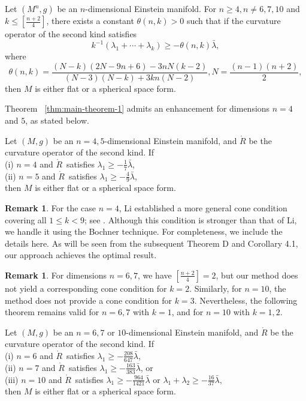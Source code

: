 \documentclass[11pt, reqno]{amsart}
\numberwithin{equation}{section}
\theoremstyle{definition}
\newtheorem{remark}[thm]{Remark}
\begin{document}
	\begin{maintheorem}\label{thm:main-theorem-1}
		Let $(M^n, g)$ be an $n$-dimensional  Einstein manifold. For $n \ge 4,n\ne 6, 7, 10$ and $k\le[\frac{n+2}{4}]$, there exists a constant $\theta(n,k) >0$ such that if the curvature operator of the second kind satisfies 
		\[k^{-1}({\lambda }_1+\cdots +{\lambda }_k)\ge -\theta(n,k) \bar{\lambda },\]
		where $$\theta(n,k) =\frac{(N-k)(2N-9n+6)-3nN(k-2)}{(N-3)(N-k)+3kn(N-2)},N=\frac{(n-1)(n+2)}{2},$$
		then $M$ is either flat or a spherical space form.
	\end{maintheorem}
	Theorem ~\ref{thm:main-theorem-1}  admits an enhancement for dimensions $n = 4$ and $5$, as stated below.
		\begin{maintheorem}\label{thm:main-theorem-2} 
		Let $(M, g)$ be an $n = 4, 5$-dimensional  Einstein manifold, and $\mathring{R}$ be the curvature operator of the second kind. If\\
		(i) $n=4$ and $\mathring{R}\,$ satisfies ${\lambda }_1\ge -\frac{1}{7}\bar{\lambda }$,\\
		(ii) $n=5$ and $\mathring{R}\,$ satisfies ${\lambda }_1\ge -\frac{4}{9}\bar{\lambda }$,\\
		then $M$ is either flat or a spherical space form.
	\end{maintheorem}	
	\begin{remark}
		For the case $n=4$, Li established a more general cone condition covering all $1\le k < 9$; see \cite[Throrem 1.5]{Li5}. Although this condition is stronger than that of Li, we handle it using the Bochner technique. For completeness, we include the details here. As will be seen from the subsequent Theorem D and Corollary 4.1, our approach achieves the optimal result.
	\end{remark}
	\begin{remark}
		For dimensions $n=6,7$, we have $[\frac{n+2}{4}]=2$, but our method does not yield a corresponding cone condition for $k=2$. Similarly, for $n=10$, the method does not provide a cone condition for $k=3$. Nevertheless, the following theorem remains valid for  $n=6,7$ with $k=1$, and for $n=10$ with $k=1,2$.
	\end{remark}
	\begin{maintheorem}\label{thm:main-theorem-3} 
		Let $(M, g)$ be an $n = 6, 7$ or $10$-dimensional  Einstein manifold, and $\mathring{R}$ be the curvature operator of the second kind. If\\
		(i) $n=6$ and $\mathring{R}\,$ satisfies ${\lambda }_1\ge -\frac{208}{647}\bar{\lambda }$, \\
		(ii) $n=7$ and $\mathring{R}\,$ satisfies ${\lambda }_1\ge -\frac{163}{383}\bar{\lambda }$, or\\
		(iii) $n=10$ and $\mathring{R}\,$ satisfies ${\lambda }_1\ge -\frac{964}{1421}\bar{\lambda }$ or ${\lambda }_1+{\lambda }_2\ge -\frac{16}{37}\bar{\lambda},$\\
		then $M$ is either flat or a spherical space form.
	\end{maintheorem}
\end{document}
